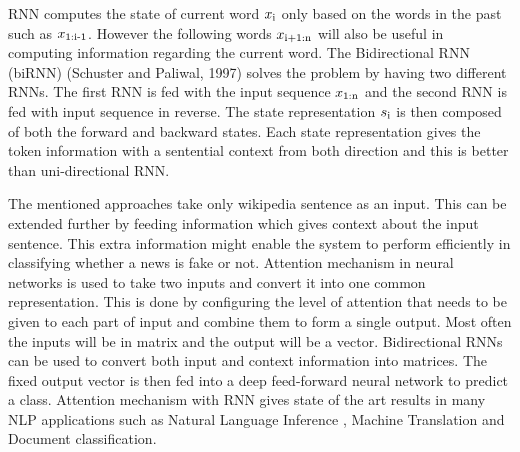 \documentclass[a4paper, 11pt]{article}
\newcommand{\R}{\mathbb{R}}
\begin{document}

RNN computes the state of current word $x\textsubscript{i}$ only based on the words in the past such as $x\textsubscript{1:i-1}$. However the following words $x\textsubscript{i+1:n}$ will also be useful in computing information regarding the current word. The Bidirectional RNN (biRNN) (Schuster and Paliwal, 1997) solves the problem by having two different RNNs. The first RNN is fed with the input sequence $x\textsubscript{1:n}$ and the second RNN is fed with input sequence in reverse. The state representation $s\textsubscript{i}$ is then composed of both the forward and backward states. Each state representation gives the token information with a sentential context from both direction and this is better than uni-directional RNN.

The mentioned approaches take only wikipedia sentence as an input. This can be extended further by feeding information which gives context about the input sentence. This extra information might enable the system to perform efficiently in classifying whether a news is fake or not. Attention mechanism in neural networks is used to take two inputs and convert it into one common representation. This is done by configuring the level of attention that needs to be given to each part of input and combine them to form a single output. Most often the inputs will be in matrix and the output will be a vector. Bidirectional RNNs can be used to convert both input and context information into matrices. The fixed output vector is then fed into a deep feed-forward neural network to predict a class. Attention mechanism with RNN gives state of the art results in many NLP applications such as Natural Language Inference \cite{Parikh2016}, Machine Translation\cite{Bahdanau2014} and Document classification\cite{Yang2016}.
\end{document}
